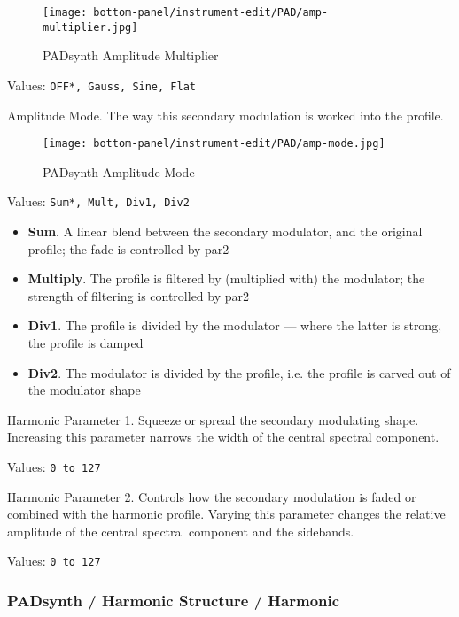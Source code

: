 \begin{figure}[H]
   \centering
   \texttt{[image: bottom-panel/instrument-edit/PAD/amp-multiplier.jpg]}
   \caption{PADsynth Amplitude Multiplier}
   \label{fig:padsynth_amplitude_multiplier}
\end{figure}

   Values: \texttt{OFF*, Gauss, Sine, Flat}

   Amplitude Mode.
   The way this secondary modulation is worked into the profile.

\begin{figure}[H]
   \centering
   \texttt{[image: bottom-panel/instrument-edit/PAD/amp-mode.jpg]}
   \caption{PADsynth Amplitude Mode}
   \label{fig:padsynth_amplitude_mode}
\end{figure}

   Values: \texttt{Sum*, Mult, Div1, Div2}

   \begin{itemize}
      \item \textbf{Sum}.
         A linear blend between the secondary modulator, and the original
         profile; the fade is controlled by par2
      \item \textbf{Multiply}.
         The profile is filtered by (multiplied with) the modulator; the strength
         of filtering is controlled by par2
      \item \textbf{Div1}.
         The profile is divided by the modulator — where the latter is strong, the
         profile is damped
      \item \textbf{Div2}.
         The modulator is divided by the profile, i.e. the profile is carved out of
         the modulator shape
   \end{itemize}

   Harmonic Parameter 1.
   Squeeze or spread the secondary modulating shape.
   Increasing this parameter narrows the width of the central spectral
   component.

   Values: \texttt{0 to 127}

   Harmonic Parameter 2.
   Controls how the secondary modulation is faded or combined with the harmonic
   profile.  Varying this parameter changes the relative amplitude of the central
   spectral component and the sidebands.

   Values: \texttt{0 to 127}

\subsubsection{PADsynth / Harmonic Structure / Harmonic}
\label{subsubsec:padsynth_harmonic_structure_harmonic}

